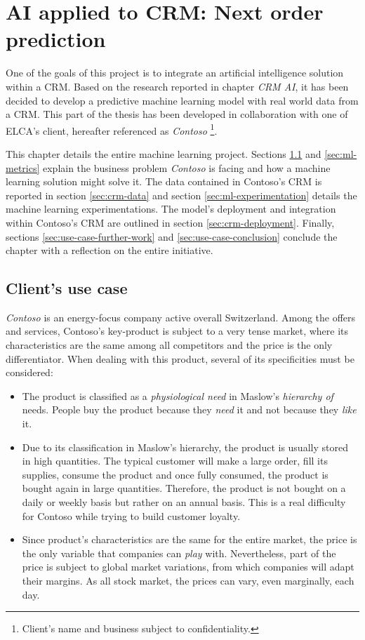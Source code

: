 \chapter{AI applied to CRM: Next order prediction} \label{chapter:use-case}


One of the goals of this project is to integrate an artificial intelligence solution within a CRM. Based on the research reported in chapter \textit{CRM AI}, it has been decided to develop a predictive machine learning model with real world data from a CRM. This part of the thesis has been developed in collaboration with one of ELCA's client, hereafter referenced as \textit{Contoso} \footnote{Client's name and business subject to confidentiality.}.

This chapter details the entire machine learning project. Sections \ref{sec:use-case} and \ref{sec:ml-metrics} explain the business problem \textit{Contoso} is facing and how a machine learning solution might solve it. The data contained in Contoso's CRM is reported in section \ref{sec:crm-data} and section \ref{sec:ml-experimentation} details the machine learning experimentations. The model's deployment and integration within Contoso's CRM are outlined in section \ref{sec:crm-deployment}. Finally, sections \ref{sec:use-case-further-work} and \ref{sec:use-case-conclusion} conclude the chapter with a reflection on the entire initiative.

\section{Client's use case} \label{sec:use-case}
\textit{Contoso} is an energy-focus company active overall Switzerland. Among the offers and services, Contoso's key-product is subject to a very tense market, where its characteristics are the same among all competitors and the price is the only differentiator. When dealing with this product, several of its specificities must be considered:
\begin{itemize}
\item The product is classified as a \textit{physiological need} in Maslow's \textit{hierarchy of }needs\cite{def:Maslow}. People buy the product because they \textit{need} it and not because they \textit{like} it.
\item Due to its classification in Maslow's hierarchy, the product is usually stored in high quantities. The typical customer will make a large order, fill its supplies, consume the product and once fully consumed, the product is bought again in large quantities. Therefore, the product is not bought on a daily or weekly basis but rather on an annual basis. This is a real difficulty for Contoso while trying to build customer loyalty.
\item Since product's characteristics are the same for the entire market, the price is the only variable that companies can \textit{play} with. Nevertheless, part of the price is subject to global market variations, from which companies will adapt their margins. As all stock market, the prices can vary, even marginally, each day.
\end{itemize}

